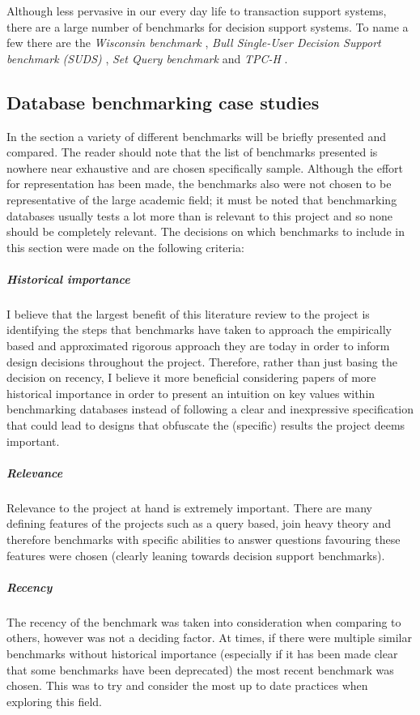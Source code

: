 Although less pervasive in our every day life to transaction support systems,
there are a large number of benchmarks for decision support systems. To name a
few there are the \emph{Wisconsin benchmark} \cite{Wisconsin}, \emph{Bull Single-User Decision
Support benchmark (SUDS)} \cite{PractitionersIntroduction}, \emph{Set Query
benchmark} \cite{SetQueryBenchmark} and \emph{TPC-H} \cite{TPC-H}. 

\subsection{Database benchmarking case studies}
In the section a variety of different benchmarks will be briefly presented and
compared. The reader should note that the list of benchmarks presented is
nowhere near exhaustive and are chosen specifically sample. Although the effort
for representation has been made, the benchmarks also were not chosen to be
representative of the large academic field; it must be noted that benchmarking
databases usually tests a lot more than is relevant to this project and so none
should be completely relevant. The decisions on which benchmarks to include in
this section were made on the following criteria:
\subparagraph{Historical importance}\label{enum:historicalImportance} I believe that the largest benefit of this
literature review to the project is identifying the steps that benchmarks have
taken to approach the empirically based and approximated rigorous approach they
are today in order to inform design decisions throughout the project. Therefore,
rather than just basing the decision on recency, I believe it more beneficial
considering papers of more historical importance in order to present an
intuition on key values within benchmarking databases instead of following a
clear and inexpressive specification that could lead to designs that obfuscate
the (specific) results the project deems important. 
\subparagraph{Relevance} Relevance to the project at hand is extremely
important. There are many defining features of the projects such as a query
based, join heavy theory and therefore benchmarks with specific abilities to
answer questions favouring these features were chosen (clearly leaning towards
decision support benchmarks).
\subparagraph{Recency} The recency of the benchmark was taken into consideration
when comparing to others, however was not a deciding factor. At times, if there
were multiple similar benchmarks without historical importance (especially if
it has been made clear that some benchmarks have been deprecated) the most
recent benchmark was chosen. This was to try and consider the most up to date
practices when exploring this field.

